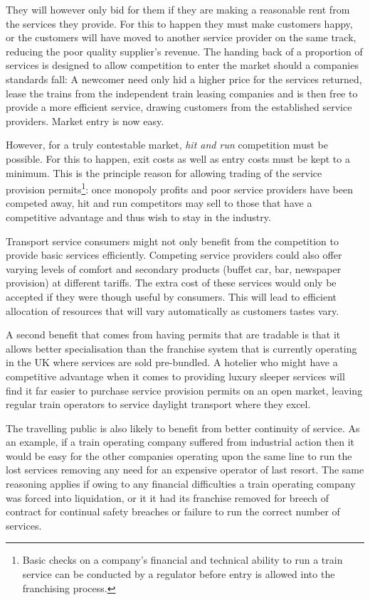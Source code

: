 They will however only bid for them if they are making a reasonable rent from the services they provide. For this to happen they must make customers happy, or the customers will have moved to another service provider on the same track, reducing the poor quality supplier's revenue. The handing back of a proportion of services is designed to allow competition to enter the market should a companies standards fall: A newcomer need only hid a higher price for the services returned, lease the trains from the independent train leasing companies and is then free to provide a more efficient service, drawing customers from the established service providers. Market entry is now easy.

However, for a truly contestable market, \textit{hit and run} competition must be possible. For this to happen, exit costs as well as entry costs must be kept to a minimum. This is the principle reason for allowing trading of the service provision permits\footnote{Basic checks on a company's financial and technical ability to run a train service can be conducted by a regulator before entry is allowed into the franchising process.}: once monopoly profits and poor service providers have been competed away, hit and run competitors may sell to those that have a competitive advantage and thus wish to stay in the industry.

Transport service consumers might not only benefit from the competition to provide basic services efficiently. Competing service providers could also offer varying levels of comfort and secondary products (buffet car, bar, newspaper provision) at different tariffs. The extra cost of these services would only be accepted if they were though useful by consumers. This will lead to efficient allocation of resources that will vary automatically as customers tastes vary.

A second benefit that comes from having permits that are tradable is that it allows better specialisation than the franchise system that is currently operating in the UK where services are sold pre-bundled. A hotelier who might have a competitive advantage when it comes to providing luxury sleeper services will find it far easier to purchase service provision permits on an open market, leaving regular train operators to service daylight transport where they excel.

The travelling public is also likely to benefit from better continuity of service. As an example, if a train operating company suffered from industrial action then it would be easy for the other companies operating upon the same line to run the lost services removing any need for an expensive operator of last resort. The same reasoning applies if owing to any financial difficulties a train operating company was forced into liquidation, or it it had its franchise removed for breech of contract for continual safety breaches or failure to run the correct number of services.

